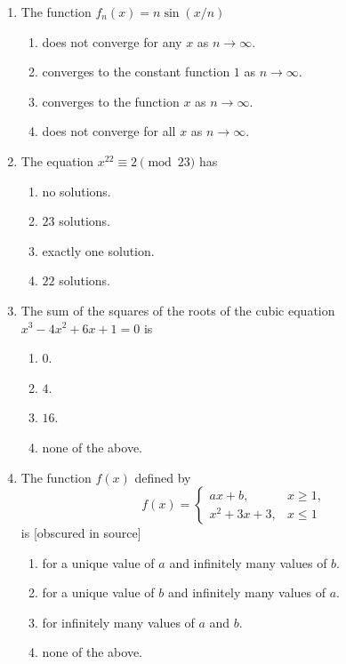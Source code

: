 \documentclass[11pt, a4paper]{article}
\begin{document}
\begin{enumerate}
  \item The function $f_n(x) = n \sin(x/n)$
  \begin{enumerate}[label=(\alph*)]
    \item does not converge for any $x$ as $n \to \infty$.
    \item converges to the constant function $1$ as $n \to \infty$.
    \item converges to the function $x$ as $n \to \infty$.
    \item does not converge for all $x$ as $n \to \infty$.
  \end{enumerate}

  \item The equation $x^{22} \equiv 2 \pmod{23}$ has
  \begin{enumerate}[label=(\alph*)]
    \item no solutions.
    \item $23$ solutions.
    \item exactly one solution.
    \item $22$ solutions.
  \end{enumerate}

  \item The sum of the squares of the roots of the cubic equation $x^3 - 4x^2 + 6x + 1 = 0$ is
  \begin{enumerate}[label=(\alph*)]
    \item $0$.
    \item $4$.
    \item $16$.
    \item none of the above.
  \end{enumerate}

  \item The function $f(x)$ defined by
  \[
    f(x) = \begin{cases} ax + b, & x \ge 1, \\ x^2 + 3x + 3, & x \le 1 \end{cases}
  \]
  is {[obscured in source]}
  \begin{enumerate}[label=(\alph*)]
    \item for a unique value of $a$ and infinitely many values of $b$.
    \item for a unique value of $b$ and infinitely many values of $a$.
    \item for infinitely many values of $a$ and $b$.
    \item none of the above.
  \end{enumerate}


\end{enumerate}
\end{document}
